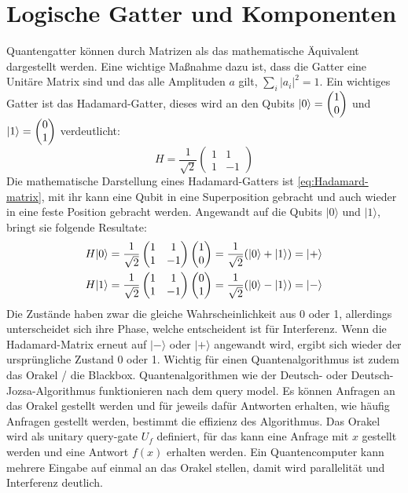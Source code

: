 \section{Logische Gatter und Komponenten}
Quantengatter können durch Matrizen als das mathematische Äquivalent dargestellt werden.
Eine wichtige Maßnahme dazu ist, dass die Gatter eine Unitäre Matrix sind und das alle Amplituden $a$ gilt, $\sum_{i}{|a_i|}^2=1$.
Ein wichtiges Gatter ist das Hadamard-Gatter, dieses wird an den Qubits $|0\rangle=\begin{pmatrix}1\\0\end{pmatrix}$ und $|1\rangle=\begin{pmatrix}0\\1\end{pmatrix}$ verdeutlicht:
\begin{equation}
    H = \frac{1}{\sqrt{2}}
    \begin{pmatrix}
        1 & 1\\
        1 & -1
    \end{pmatrix}
    \label{eq:Hadamard-matrix}
\end{equation}
Die mathematische Darstellung eines Hadamard-Gatters ist \ref{eq:Hadamard-matrix}, mit ihr kann eine Qubit in eine Superposition gebracht und auch wieder in eine feste Position gebracht werden.
Angewandt auf die Qubits $|0\rangle$ und $|1\rangle$, bringt sie folgende Resultate:
\begin{align}
    H|0\rangle =  \frac{1}{\sqrt{2}} \begin{pmatrix} 1 & 1 \\ 1 & -1 \end{pmatrix}  \begin{pmatrix}1\\0\end{pmatrix} = \frac{1}{\sqrt{2}}(|0\rangle+|1\rangle) = |+\rangle\\
    H|1\rangle =  \frac{1}{\sqrt{2}} \begin{pmatrix} 1 & 1 \\ 1 & -1 \end{pmatrix}  \begin{pmatrix}0\\1\end{pmatrix} = \frac{1}{\sqrt{2}}(|0\rangle-|1\rangle) = |-\rangle
\end{align}
Die Zustände haben zwar die gleiche Wahrscheinlichkeit aus 0 oder 1, allerdings unterscheidet sich ihre Phase, welche entscheident ist für Interferenz.
Wenn die Hadamard-Matrix erneut auf $|-\rangle$ oder $|+\rangle$ angewandt wird, ergibt sich wieder der ursprüngliche Zustand 0 oder 1.
Wichtig für einen Quantenalgorithmus ist zudem das Orakel / die Blackbox.
Quantenalgorithmen wie der Deutsch- oder Deutsch-Jozsa-Algorithmus funktionieren nach dem query model.
Es können Anfragen an das Orakel gestellt werden und für jeweils dafür Antworten erhalten, wie häufig Anfragen gestellt werden, bestimmt die effizienz des Algorithmus.
Das Orakel wird als unitary query-gate $U_f$ definiert, für das kann eine Anfrage mit $x$ gestellt werden und eine Antwort $f(x)$ erhalten werden.
Ein Quantencomputer kann mehrere Eingabe auf einmal an das Orakel stellen, damit wird parallelität und Interferenz deutlich.

